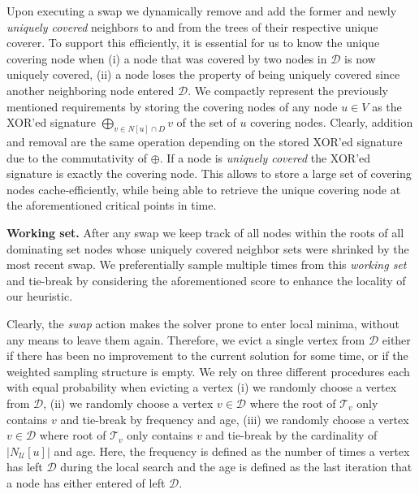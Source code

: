 \documentclass[a4paper, USenglish, cleveref, autoref, thm-restate, noalgorithm2e]{socg-lipics-v2021}
\newcommand{\domset}{\ensuremath{\mathcal D}\xspace}
\newcommand{\uniquelycovered}{\ensuremath{\mathcal U}\xspace}
\newcommand{\intersectiontree}{\ensuremath{\mathcal T}\xspace}
\begin{document}
%
Upon executing a swap we dynamically remove and add the former and newly \textit{uniquely covered} neighbors to and from the trees of their respective unique coverer.
%
To support this efficiently, it is essential for us to know the unique covering node when (i) a node that was covered by two nodes in $\domset$ is now uniquely covered, (ii) a node loses the property of being uniquely covered since another neighboring node entered $\domset$.
%
We compactly represent the previously mentioned requirements by storing the covering nodes of any node $u \in V$ as the XOR'ed signature $\bigoplus_{v \in N[u]\cap D} v$ of the set of $u$ covering nodes.
%
Clearly, addition and removal are the same operation depending on the stored XOR'ed signature due to the commutativity of $\oplus$.
%
If a node is \textit{uniquely covered} the XOR'ed signature is exactly the covering node.
%
This allows to store a large set of covering nodes cache-efficiently, while being able to retrieve the unique covering node at the aforementioned critical points in time. 

\textbf{Working set.} After any swap we keep track of all nodes within the roots of all dominating set nodes whose uniquely covered neighbor sets were shrinked by the most recent swap.
%
We preferentially sample multiple times from this \textit{working set} and tie-break by considering the aforementioned score to enhance the locality of our heuristic.

Clearly, the \textit{swap} action makes the solver prone to enter local minima, without any means to leave them again.
%
Therefore, we evict a single vertex from $\domset$ either if there has been no improvement to the current solution for some time, or if the weighted sampling structure is empty.
%
We rely on three different procedures each with equal probability when evicting a vertex (i) we randomly choose a vertex from $\domset$, (ii) we randomly choose a vertex $v \in \domset$ where the root of $\intersectiontree_v$ only contains $v$ and tie-break by frequency and age, (iii) we randomly choose a vertex $v \in \domset$ where root of $\intersectiontree_v$ only contains $v$ and tie-break by the cardinality of $|N_{\uniquelycovered}[u]|$ and age.
%
Here, the frequency is defined as the number of times a vertex has left $\domset$ during the local search and the age is defined as the last iteration that a node has either entered of left $\domset$.   










\end{document}
